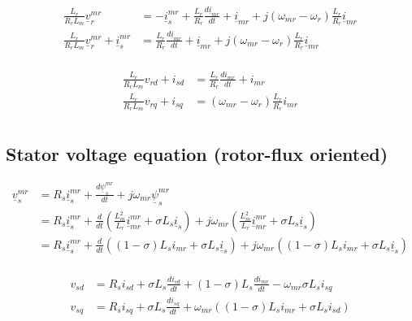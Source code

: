 \documentclass[]{book}
\begin{document}
\[
\begin{aligned}
\frac{L_r}{R_r L_m} \underline{v}^{mr}_r  & =  -\underline{i}^{mr}_s   + \frac{L_r}{R_r} \frac{d  \underline{i}_{mr} }{dt} + \underline{i}_{mr}  + j (\omega_{mr}-\omega_r) \frac{L_r}{R_r} \underline{i}_{mr} \\
\frac{L_r}{R_r L_m} \underline{v}^{mr}_r +\underline{i}^{mr}_s  & =  \frac{L_r}{R_r} \frac{d  \underline{i}_{mr} }{dt} + \underline{i}_{mr}  + j (\omega_{mr}-\omega_r) \frac{L_r}{R_r} \underline{i}_{mr} \\
\end{aligned}
\label{eq:rotorFluxRotVolt2}
\]

\[
\begin{aligned}
\frac{L_r}{R_r L_m} v_{rd} +i_{sd}  & =  \frac{L_r}{R_r} \frac{d  i_{mr} }{dt} + i_{mr} \\
\frac{L_r}{R_r L_m} v_{rq} +i_{sq}  & =  (\omega_{mr}-\omega_r) \frac{L_r}{R_r} i_{mr} \\
\end{aligned}
\label{eq:rotorFluxRotVolt3}
\]

\hypertarget{stator-voltage-equation-rotor-flux-oriented}{%
\subsection{Stator voltage equation (rotor-flux oriented)}\label{stator-voltage-equation-rotor-flux-oriented}}

\[
\begin{aligned}
\underline{v}^{mr}_s & = R_s \underline{i}^{mr}_s  + \frac{d\underline{\psi}^{mr}_s}{dt}   + j\omega_{mr}  \underline{\psi}^{mr}_s  \\
 & = R_s \underline{i}^{mr}_s  + \frac{d}{dt}(\frac{L^2_m}{L_r}\underline{i}^{mr}_{mr}  + \sigma L_s \underline{i}_s)   + j\omega_{mr}  (\frac{L^2_m}{L_r}\underline{i}^{mr}_{mr}  + \sigma L_s \underline{i}_s)  \\
 & = R_s \underline{i}^{mr}_s  + \frac{d}{dt}( (1-\sigma)L_s i_{mr}  + \sigma L_s \underline{i}_s)   + j\omega_{mr}  ((1-\sigma)L_s i_{mr}  + \sigma L_s \underline{i}_s)  \\
\end{aligned}
\label{eq:rotorFluxStaVolt1}
\]

\[
\begin{aligned}
v_{sd} & = R_s i_{sd}  + \sigma L_s \frac{d i_{sd}}{dt} + (1-\sigma)L_s \frac{d i_{mr}}{dt} - \omega_{mr}     \sigma L_s i_{sq}  \\
v_{sq} & = R_s i_{sq}  + \sigma L_s \frac{d i_{sq}}{dt} + \omega_{mr}  ((1-\sigma)L_s i_{mr}  + \sigma L_s i_{sd})  \\
\end{aligned}
\label{eq:rotorFluxStaVolt2}
\]
\end{document}
